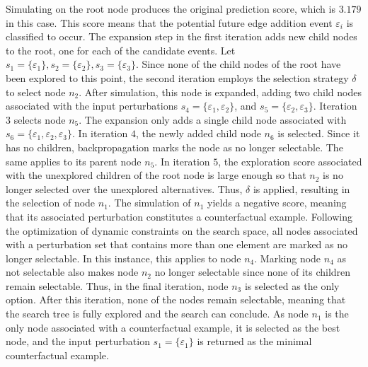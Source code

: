 Simulating on the root node produces the original prediction score, which is $3.179$ in this case. This score means that the potential future edge addition event $\varepsilon_i$ is classified to occur. The expansion step in the first iteration adds new child nodes to the root, one for each of the candidate events. Let $s_1 = \{\varepsilon_1\}, s_2 = \{\varepsilon_2\}, s_3 = \{\varepsilon_3\}$. Since none of the child nodes of the root have been explored to this point, the second iteration employs the selection strategy $\delta$ to select node $n_2$. After simulation, this node is expanded, adding two child nodes associated with the input perturbations $s_4 = \{\varepsilon_1, \varepsilon_2\}$, and $s_5 = \{\varepsilon_2, \varepsilon_3\}$. Iteration $3$ selects node $n_5$. The expansion only adds a single child node associated with $s_6 = \{\varepsilon_1, \varepsilon_2, \varepsilon_3\}$. In iteration $4$, the newly added child node $n_6$ is selected. Since it has no children, backpropagation marks the node as no longer selectable. The same applies to its parent node $n_5$. In iteration $5$, the exploration score associated with the unexplored children of the root node is large enough so that $n_2$ is no longer selected over the unexplored alternatives. Thus, $\delta$ is applied, resulting in the selection of node $n_1$. The simulation of $n_1$ yields a negative score, meaning that its associated perturbation constitutes a counterfactual example. Following the optimization of dynamic constraints on the search space, all nodes associated with a perturbation set that contains more than one element are marked as no longer selectable. In this instance, this applies to node $n_4$. Marking node $n_4$ as not selectable also makes node $n_2$ no longer selectable since none of its children remain selectable. Thus, in the final iteration, node $n_3$ is selected as the only option. After this iteration, none of the nodes remain selectable, meaning that the search tree is fully explored and the search can conclude. As node $n_1$ is the only node associated with a counterfactual example, it is selected as the best node, and the input perturbation $s_1 = \{\varepsilon_1\}$ is returned as the minimal counterfactual example.


